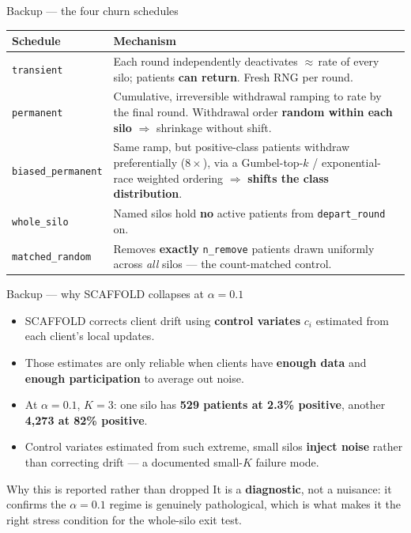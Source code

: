 \documentclass[aspectratio=169, 11pt]{beamer}
\begin{document}
\begin{frame}{Backup --- the four churn schedules}
\begin{center}\small
\begin{tabular}{p{2.7cm}p{9.4cm}}
\toprule
\textbf{Schedule} & \textbf{Mechanism}\\
\midrule
\texttt{transient} &
  Each round independently deactivates $\approx$\,rate of every silo;
  patients \textbf{can return}. Fresh RNG per round.\\
\addlinespace
\texttt{permanent} &
  Cumulative, irreversible withdrawal ramping to rate by the final round.
  Withdrawal order \textbf{random within each silo} $\Rightarrow$ shrinkage
  without shift.\\
\addlinespace
\texttt{biased\_permanent} &
  Same ramp, but positive-class patients withdraw preferentially
  ($8\times$), via a Gumbel-top-$k$ / exponential-race weighted ordering
  $\Rightarrow$ \textbf{shifts the class distribution}.\\
\addlinespace
\texttt{whole\_silo} &
  Named silos hold \textbf{no} active patients from \texttt{depart\_round} on.\\
\addlinespace
\texttt{matched\_random} &
  Removes \textbf{exactly} \texttt{n\_remove} patients drawn uniformly across
  \emph{all} silos --- the count-matched control.\\
\bottomrule
\end{tabular}
\end{center}
\end{frame}

\begin{frame}{Backup --- why SCAFFOLD collapses at $\alpha{=}0.1$}
\begin{itemize}
\item SCAFFOLD corrects client drift using \textbf{control variates}
      $c_i$ estimated from each client's local updates.
\item Those estimates are only reliable when clients have
      \textbf{enough data} and \textbf{enough participation} to average out
      noise.
\item At $\alpha{=}0.1$, $K{=}3$: one silo has \textbf{529 patients at 2.3\%
      positive}, another \textbf{4,273 at 82\% positive}.
\item Control variates estimated from such extreme, small silos
      \textbf{inject noise} rather than correcting drift --- a documented
      small-$K$ failure mode.
\end{itemize}
\vspace{0.5em}
\begin{block}{Why this is reported rather than dropped}
It is a \textbf{diagnostic}, not a nuisance: it confirms the
$\alpha{=}0.1$ regime is genuinely pathological, which is what makes it the
right stress condition for the whole-silo exit test.
\end{block}
\end{frame}
\end{document}
